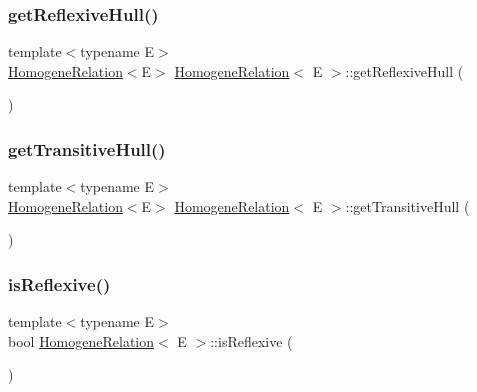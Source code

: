 \subsubsection{\texorpdfstring{get\+Reflexive\+Hull()}{getReflexiveHull()}}
{\footnotesize\ttfamily template$<$typename E$>$ \\
\hyperlink{classHomogeneRelation}{Homogene\+Relation}$<$E$>$ \hyperlink{classHomogeneRelation}{Homogene\+Relation}$<$ E $>$\+::get\+Reflexive\+Hull (\begin{DoxyParamCaption}{ }\end{DoxyParamCaption})}

\mbox{\label{classHomogeneRelation_a58ad1b44e13bc9af69d41e4be18b190b}} 
\subsubsection{\texorpdfstring{get\+Transitive\+Hull()}{getTransitiveHull()}}
{\footnotesize\ttfamily template$<$typename E$>$ \\
\hyperlink{classHomogeneRelation}{Homogene\+Relation}$<$E$>$ \hyperlink{classHomogeneRelation}{Homogene\+Relation}$<$ E $>$\+::get\+Transitive\+Hull (\begin{DoxyParamCaption}{ }\end{DoxyParamCaption})}

\mbox{\label{classHomogeneRelation_a024cada131a710595be8595e94826902}} 
\subsubsection{\texorpdfstring{is\+Reflexive()}{isReflexive()}}
{\footnotesize\ttfamily template$<$typename E$>$ \\
bool \hyperlink{classHomogeneRelation}{Homogene\+Relation}$<$ E $>$\+::is\+Reflexive (\begin{DoxyParamCaption}{ }\end{DoxyParamCaption})}

\mbox{\label{classHomogeneRelation_afe168dd3f5c26156d76575d55e40730b}} 
